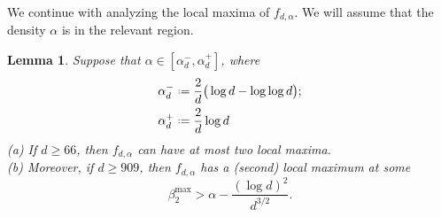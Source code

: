 \documentclass[12pt]{amsart}
\newtheorem{lemma}[theorem]{Lemma}
\theoremstyle{definition}
\newcommand\al{\alpha}
\newcommand\be{\beta}
\newcommand{\defeq}{\mathrel{\vcenter{\baselineskip0.5ex \lineskiplimit0pt
                     \hbox{\scriptsize.}\hbox{\scriptsize.}}}%
                     =}
\begin{document}
We continue with analyzing the local maxima of $f_{d,\al}$. We will assume that the density $\al$ is in the relevant region.
%
\begin{lemma} \label{lem:local_maxima}
Suppose that $\al \in [\al_d^-,\al_d^+]$, where 
%
\begin{align}
\begin{split}
\al_d^- &\defeq \frac{2}{d} \big( \log d - \log\log d \big) ;\\
\al_d^+ &\defeq \frac{2}{d} \log d
\label{eq:al+-}
\end{split}
\end{align}
%
\noindent (a) If $d \geq 66$, then $f_{d,\al}$ can have at most two local maxima.\\
(b) Moreover, if $d \geq 909$, then $f_{d,\al}$ has a (second) local maximum at some 
%
\[ \be_2^{\max}>\al- \frac{(\log d)^2}{d^{3/2}} .\]
%
\end{lemma}
%
\end{document}
